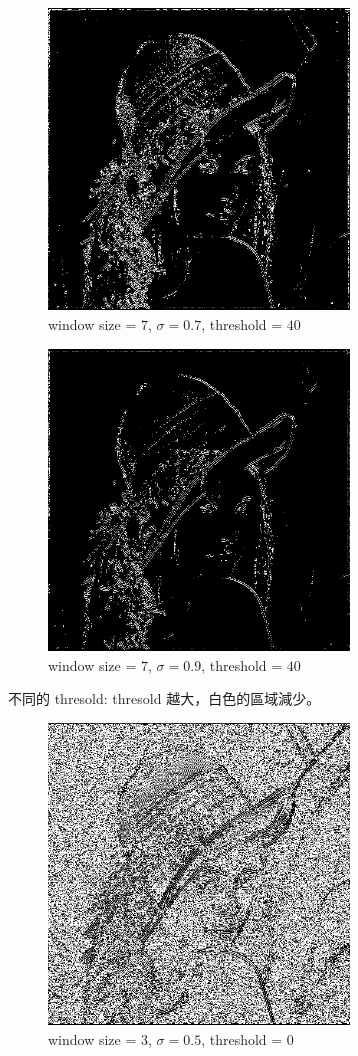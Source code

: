 \documentclass[conference]{IEEEtran}
\begin{document}
\begin{figure}[H]
\centerline{\includegraphics[width=8cm]{lena07.png}}
\caption{window size = $7$, $\sigma=0.7$,  threshold = $40$}
\label{lena07}
\end{figure}

\begin{figure}[H]
\centerline{\includegraphics[width=8cm]{lena08.png}}
\caption{window size = $7$, $\sigma=0.9$,  threshold = $40$}
\label{lena08}
\end{figure}

不同的 thresold: thresold 越大，白色的區域減少。

\begin{figure}[H]
\centerline{\includegraphics[width=8cm]{lena09.png}}
\caption{window size = $3$, $\sigma=0.5$,  threshold = $0$}
\label{lena9}
\end{figure}
\end{document}
